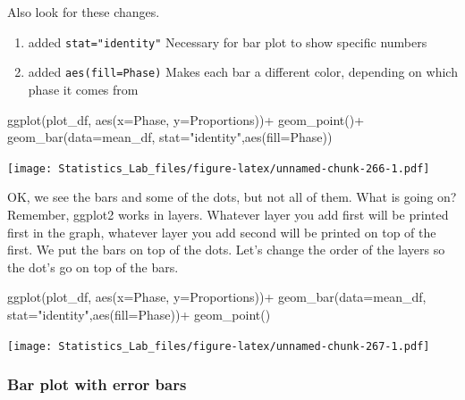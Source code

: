 \documentclass[
]{book}
\newenvironment{Shaded}{\begin{snugshade}}{\end{snugshade}}
\newcommand{\AttributeTok}[1]{\textcolor[rgb]{0.77,0.63,0.00}{#1}}
\newcommand{\FunctionTok}[1]{\textcolor[rgb]{0.00,0.00,0.00}{#1}}
\newcommand{\NormalTok}[1]{#1}
\newcommand{\SpecialCharTok}[1]{\textcolor[rgb]{0.00,0.00,0.00}{#1}}
\newcommand{\StringTok}[1]{\textcolor[rgb]{0.31,0.60,0.02}{#1}}
\providecommand{\tightlist}{%
  \setlength{\itemsep}{0pt}\setlength{\parskip}{0pt}}
\begin{document}
Also look for these changes.

\begin{enumerate}
\def\labelenumi{\arabic{enumi}.}
\tightlist
\item
  added \texttt{stat="identity"} Necessary for bar plot to show specific numbers
\item
  added \texttt{aes(fill=Phase)} Makes each bar a different color, depending on which phase it comes from
\end{enumerate}

\begin{Shaded}
\begin{Highlighting}[]
\FunctionTok{ggplot}\NormalTok{(plot\_df, }\FunctionTok{aes}\NormalTok{(}\AttributeTok{x=}\NormalTok{Phase, }\AttributeTok{y=}\NormalTok{Proportions))}\SpecialCharTok{+} 
  \FunctionTok{geom\_point}\NormalTok{()}\SpecialCharTok{+}
  \FunctionTok{geom\_bar}\NormalTok{(}\AttributeTok{data=}\NormalTok{mean\_df, }\AttributeTok{stat=}\StringTok{"identity"}\NormalTok{,}\FunctionTok{aes}\NormalTok{(}\AttributeTok{fill=}\NormalTok{Phase))}
\end{Highlighting}
\end{Shaded}

\texttt{[image: Statistics\_Lab\_files/figure-latex/unnamed-chunk-266-1.pdf]}

OK, we see the bars and some of the dots, but not all of them. What is going on? Remember, ggplot2 works in layers. Whatever layer you add first will be printed first in the graph, whatever layer you add second will be printed on top of the first. We put the bars on top of the dots. Let's change the order of the layers so the dot's go on top of the bars.

\begin{Shaded}
\begin{Highlighting}[]
\FunctionTok{ggplot}\NormalTok{(plot\_df, }\FunctionTok{aes}\NormalTok{(}\AttributeTok{x=}\NormalTok{Phase, }\AttributeTok{y=}\NormalTok{Proportions))}\SpecialCharTok{+} 
  \FunctionTok{geom\_bar}\NormalTok{(}\AttributeTok{data=}\NormalTok{mean\_df, }\AttributeTok{stat=}\StringTok{"identity"}\NormalTok{,}\FunctionTok{aes}\NormalTok{(}\AttributeTok{fill=}\NormalTok{Phase))}\SpecialCharTok{+}
  \FunctionTok{geom\_point}\NormalTok{()}
\end{Highlighting}
\end{Shaded}

\texttt{[image: Statistics\_Lab\_files/figure-latex/unnamed-chunk-267-1.pdf]}

\hypertarget{bar-plot-with-error-bars}{%
\subsubsection{Bar plot with error bars}\label{bar-plot-with-error-bars}}
\end{document}
